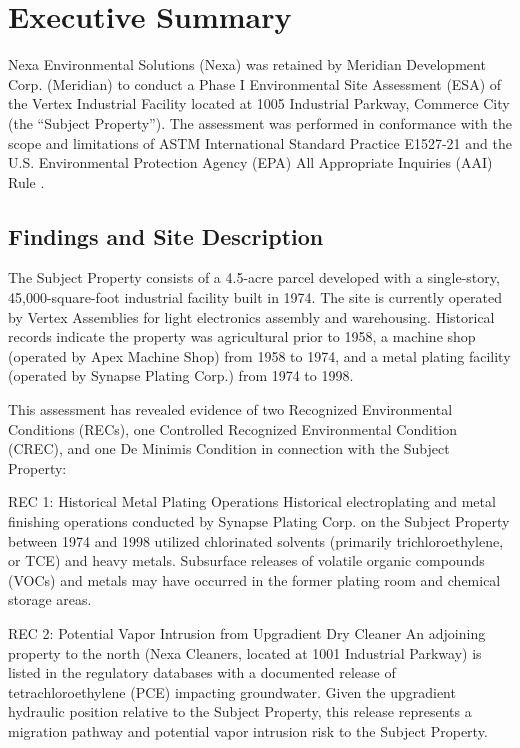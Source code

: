 \section*{Executive Summary}

Nexa Environmental Solutions (Nexa) was retained by Meridian Development Corp. (Meridian) to conduct a Phase I Environmental Site Assessment (ESA) of the Vertex Industrial Facility located at 1005 Industrial Parkway, Commerce City (the ``Subject Property''). The assessment was performed in conformance with the scope and limitations of ASTM International Standard Practice E1527-21 \cite{astme1527} and the U.S. Environmental Protection Agency (EPA) All Appropriate Inquiries (AAI) Rule \cite{epa2018}.

\subsection*{Findings and Site Description}
The Subject Property consists of a 4.5-acre parcel developed with a single-story, 45,000-square-foot industrial facility built in 1974. The site is currently operated by Vertex Assemblies for light electronics assembly and warehousing. Historical records indicate the property was agricultural prior to 1958, a machine shop (operated by Apex Machine Shop) from 1958 to 1974, and a metal plating facility (operated by Synapse Plating Corp.) from 1974 to 1998.

This assessment has revealed evidence of two Recognized Environmental Conditions (RECs), one Controlled Recognized Environmental Condition (CREC), and one De Minimis Condition in connection with the Subject Property:

\begin{recbox}{REC 1: Historical Metal Plating Operations}
Historical electroplating and metal finishing operations conducted by Synapse Plating Corp. on the Subject Property between 1974 and 1998 utilized chlorinated solvents (primarily trichloroethylene, or TCE) and heavy metals. Subsurface releases of volatile organic compounds (VOCs) and metals may have occurred in the former plating room and chemical storage areas.
\end{recbox}

\begin{recbox}{REC 2: Potential Vapor Intrusion from Upgradient Dry Cleaner}
An adjoining property to the north (Nexa Cleaners, located at 1001 Industrial Parkway) is listed in the regulatory databases with a documented release of tetrachloroethylene (PCE) impacting groundwater. Given the upgradient hydraulic position relative to the Subject Property, this release represents a migration pathway and potential vapor intrusion risk to the Subject Property.
\end{recbox}

